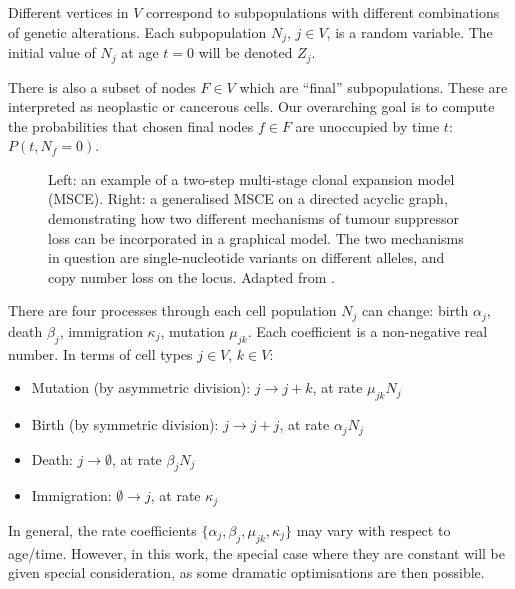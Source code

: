 \documentclass{article}
\begin{document}
Different vertices in $V$ correspond to subpopulations with different
combinations of genetic alterations. Each subpopulation $N_j$, $j \in V$, is a
random variable. The initial value of $N_j$ at age $t=0$ will be denoted $Z_j$.

There is also a subset of nodes $F \in V$ which are ``final'' subpopulations. These
are interpreted as neoplastic or cancerous cells. Our overarching goal is to
compute the probabilities that chosen final nodes $f \in F$ are
unoccupied by time $t$: $P(t, N_f = 0)$.

\begin{figure}
    \caption{Left: an example of a two-step multi-stage clonal expansion
    model (MSCE). Right: a generalised MSCE on a directed acyclic graph,
    demonstrating how two different mechanisms of tumour suppressor loss can be
    incorporated in a graphical model. The two mechanisms in question are
    single-nucleotide variants on different alleles, and copy number loss on the
    locus. Adapted from \cite{Paterson2021vs}.}
\end{figure}

There are four processes through each cell population $N_j$ can change: birth
$\alpha_j$, death $\beta_j$, immigration $\kappa_j$, mutation $\mu_{jk}$. Each
coefficient is a non-negative real number. In terms of cell types $j \in V$, $k \in V$:

\begin{itemize}
    \item Mutation (by asymmetric division): $j \rightarrow j + k$, at rate
    $\mu_{jk} N_j$
    \item Birth (by symmetric division): $j \rightarrow j + j$, at rate
    $\alpha_j N_j$
    \item Death: $j \rightarrow \emptyset$, at rate $\beta_j N_j$
    \item Immigration: $\emptyset \rightarrow j$, at rate $\kappa_j$
\end{itemize}

In general, the rate coefficients $\{\alpha_j, \beta_j, \mu_{jk},
\kappa_j\}$ may vary with respect to age/time. However, in this work, the
special case where they are constant will be given special consideration, as
some dramatic optimisations are then possible.
\end{document}
